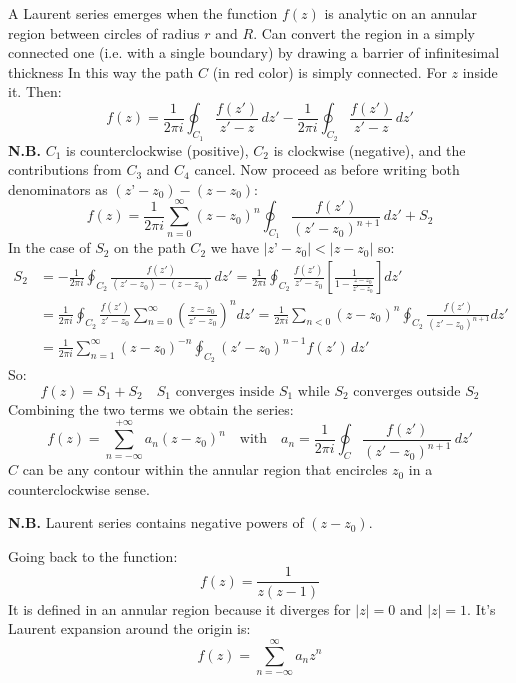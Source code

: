 \documentclass{article}
\begin{document}
\noindent
A Laurent series emerges when the function $f(z)$ is analytic on an annular region between circles of radius $r$ and $R$. Can convert the region in a simply connected one (i.e. with a single boundary) by drawing a barrier of infinitesimal thickness In this way the path $C$ (in red color) is simply connected. For $z$ inside it. Then:
\begin{equation}
    f(z) = \frac{1}{2\pi i} \oint_{C_1} \frac{f(z')}{z' - z} \, dz'
- \frac{1}{2\pi i} \oint_{C_2} \frac{f(z')}{z' - z} \, dz'
\end{equation}
\textbf{N.B.} $C_1$ is counterclockwise (positive), $C_2$ is clockwise (negative), and the contributions from $C_3$ and $C_4$ cancel. Now proceed as before writing both denominators as $(z’-z_0)-(z-z_0)$:
\begin{equation}
    f(z) = \frac{1}{2\pi i} \sum_{n=0}^{\infty} (z - z_0)^n 
\oint_{C_1} \frac{f(z')}{(z' - z_0)^{n+1}} \, dz' + S_2
\end{equation}
In the case of $S_2$ on the path $C_2$ we have $|z’-z_0|<|z-z_0|$ so:
\begin{align}
    S_2 &= -\frac{1}{2\pi i} \oint_{C_2} \frac{f(z')}{(z'-z_0) - (z-z_0)} \, dz'
= \frac{1}{2\pi i} \oint_{C_2} \frac{f(z')}{z'-z_0} 
\left[ \frac{1}{1 - \frac{z - z_0}{z' - z_0}} \right] dz'\\
&= \frac{1}{2\pi i} \oint_{C_2} \frac{f(z')}{z'-z_0} 
\sum_{n=0}^{\infty} \left( \frac{z - z_0}{z' - z_0} \right)^n dz'
= \frac{1}{2\pi i} \sum_{n < 0} (z - z_0)^n 
\oint_{C_2} \frac{f(z')}{(z' - z_0)^{n+1}} dz'\\
&= \frac{1}{2\pi i} \sum_{n=1}^{\infty} (z - z_0)^{-n} 
\oint_{C_2} (z' - z_0)^{n-1} f(z') \, dz'
\end{align}
So:
\begin{equation}
    f(z) = S_1 + S_2 \quad \text{$S_1$ converges inside $S_1$ while $S_2$ converges outside $S_2$}
\end{equation}
Combining the two terms we obtain the series:
\begin{equation}
    f(z) = \sum_{n=-\infty}^{+\infty} a_n (z - z_0)^n \quad \text{with} \quad a_n = \frac{1}{2\pi i} \oint_C \frac{f(z')}{(z' - z_0)^{n+1}}\, dz'
\end{equation}
$C$ can be any contour within the annular region that encircles $z_0$ in a counterclockwise sense.

\noindent
\textbf{N.B.} Laurent series contains negative powers of $(z-z_0)$.

\noindent
Going back to the function:
\begin{equation}
    f(z) = \frac{1}{z(z-1)}
\end{equation}
It is defined in an annular region because it diverges for $|z|=0$ and $|z|=1$. It's Laurent expansion around the origin is:
\begin{equation}
    f(z) = \sum_{n=-\infty}^{\infty} a_n z^n
\end{equation}
\end{document}
